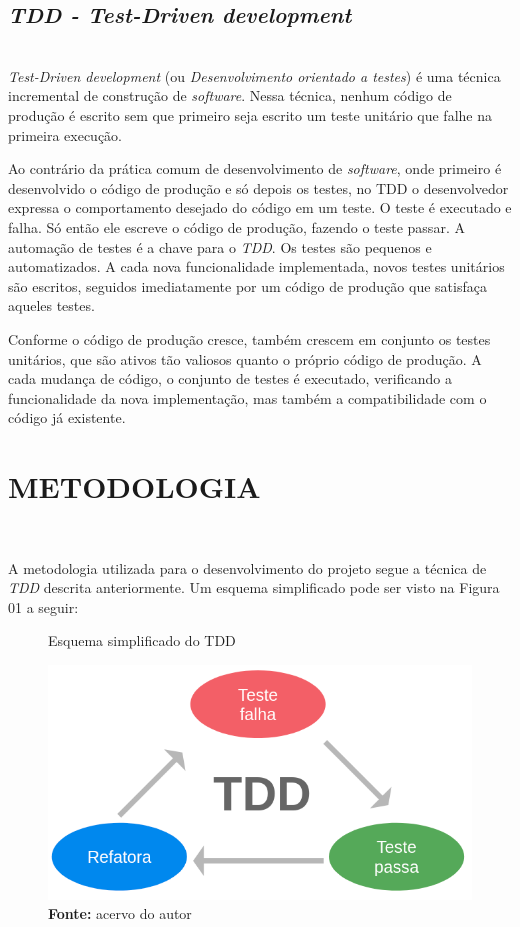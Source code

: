 \documentclass[times, twoside, watermark]{artigo}
\begin{document}
\subsection{\textit{TDD - Test-Driven development}}\hfill\\

\textit{Test-Driven development} (ou \textit{Desenvolvimento orientado a testes}) é uma técnica
incremental de construção de \textit{software}. 
Nessa técnica, nenhum código de produção é escrito sem que primeiro seja escrito um 
teste unitário que falhe na primeira execução. 

Ao contrário da prática comum de desenvolvimento de \textit{software}, onde primeiro é desenvolvido o
código de produção e só depois os testes, no TDD
o desenvolvedor expressa o comportamento desejado do código em um teste. 
O teste é executado e falha. Só então ele escreve o código de produção, fazendo o teste passar.
A automação de testes é a chave para o \textit{TDD}. Os testes são pequenos e automatizados.
A cada nova funcionalidade implementada, novos testes unitários são escritos, 
seguidos imediatamente por um código de produção que satisfaça aqueles testes. 

Conforme o código de produção cresce, também crescem em conjunto os testes unitários, 
que são ativos tão valiosos quanto o próprio código de produção. 
A cada mudança de código, o conjunto de testes é executado, verificando a funcionalidade da nova
implementação, mas também a compatibilidade com o código já existente\cite{tddembeddedc}.

\section{METODOLOGIA}\hfill\

A metodologia utilizada para o desenvolvimento do projeto segue a técnica de \textit{TDD} descrita anteriormente. 
Um esquema simplificado pode ser visto na Figura 01 a seguir:\hfill\

\begin{figure}[H]
    \centering
    \caption{Esquema simplificado do TDD}
    \includegraphics[width=0.95\linewidth]{images/tdd.png}
    \caption*{\newline\textbf{Fonte:} acervo do autor}
\end{figure}
\end{document}
